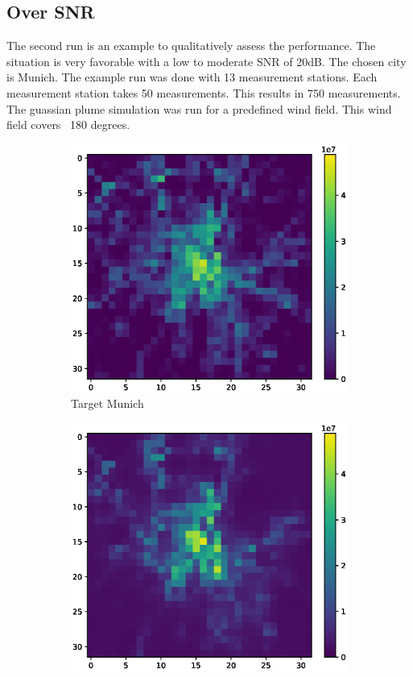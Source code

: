\subsection{Over SNR}
The second run is an example to qualitatively assess the performance.
The situation is very favorable with a low to moderate SNR of 20dB.
The chosen city is Munich.
The example run was done with 13 measurement stations.
Each measurement station takes 50 measurements.
This results in 750 measurements.
The guassian plume simulation was run for a predefined wind field.
This wind field covers ~180 degrees.
\begin{figure}
    \centering
    \begin{subfigure}[b]{0.32\textwidth}
        \includegraphics[width=\textwidth]{figures/06_results/gaussian_plume_example/munich/target.eps}
        \caption{Target Munich}
    \end{subfigure}
    \begin{subfigure}[b]{0.32\textwidth}
        \includegraphics[width=\textwidth]{figures/06_results/gaussian_plume_example/munich/gen_2048_fine_tuned_20_db.eps}

\end{subfigure}
\end{figure}

